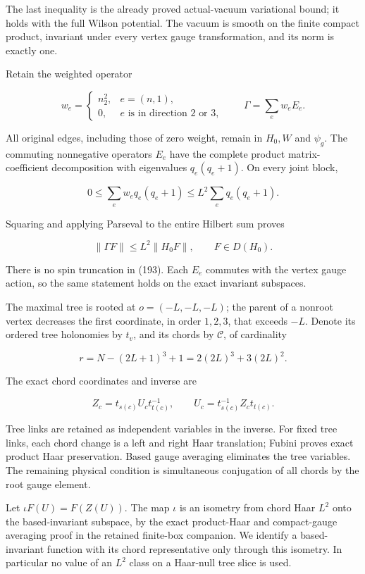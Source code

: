 \documentclass[
  11pt,
]{article}
\begin{document}
The last inequality is the already proved actual-vacuum variational
bound; it holds with the full Wilson potential. The vacuum is smooth on
the finite compact product, invariant under every vertex gauge
transformation, and its norm is exactly one.

Retain the weighted operator

\[
 w_e=
 \begin{cases}
 n_2^2,&e=(n,1),\\
 0,&e\text{ is in direction }2\text{ or }3,
 \end{cases}
 \qquad
 \Gamma=\sum_ew_eE_e.
\tag{192}
\]

All original edges, including those of zero weight, remain in \(H_0,W\)
and \(\psi_g\). The commuting nonnegative operators \(E_e\) have the
complete product matrix-coefficient decomposition with eigenvalues
\(q_e(q_e+1)\). On every joint block,

\[
 0\le\sum_ew_eq_e(q_e+1)\le L^2\sum_eq_e(q_e+1).
\]

Squaring and applying Parseval to the entire Hilbert sum proves

\[
 \|\Gamma F\|\le L^2\|H_0F\|,\qquad F\in D(H_0).
\tag{193}
\]

There is no spin truncation in (193). Each \(E_e\) commutes with the
vertex gauge action, so the same statement holds on the exact invariant
subspaces.

The maximal tree is rooted at \(o=(-L,-L,-L)\); the parent of a nonroot
vertex decreases the first coordinate, in order \(1,2,3\), that exceeds
\(-L\). Denote its ordered tree holonomies by \(t_v\), and its chords by
\(\mathcal C\), of cardinality

\[
 r=N-(2L+1)^3+1=2(2L)^3+3(2L)^2.
\]

The exact chord coordinates and inverse are

\[
 Z_c=t_{s(c)}U_ct_{t(c)}^{-1},\qquad
 U_c=t_{s(c)}^{-1}Z_ct_{t(c)}.
\tag{194}
\]

Tree links are retained as independent variables in the inverse. For
fixed tree links, each chord change is a left and right Haar
translation; Fubini proves exact product Haar preservation. Based gauge
averaging eliminates the tree variables. The remaining physical
condition is simultaneous conjugation of all chords by the root gauge
element.

Let \(\iota F(U)=F(Z(U))\). The map \(\iota\) is an isometry from chord
Haar \(L^2\) onto the based-invariant subspace, by the exact
product-Haar and compact-gauge averaging proof in the retained
finite-box companion. We identify a based-invariant function with its
chord representative only through this isometry. In particular no value
of an \(L^2\) class on a Haar-null tree slice is used.
\end{document}
